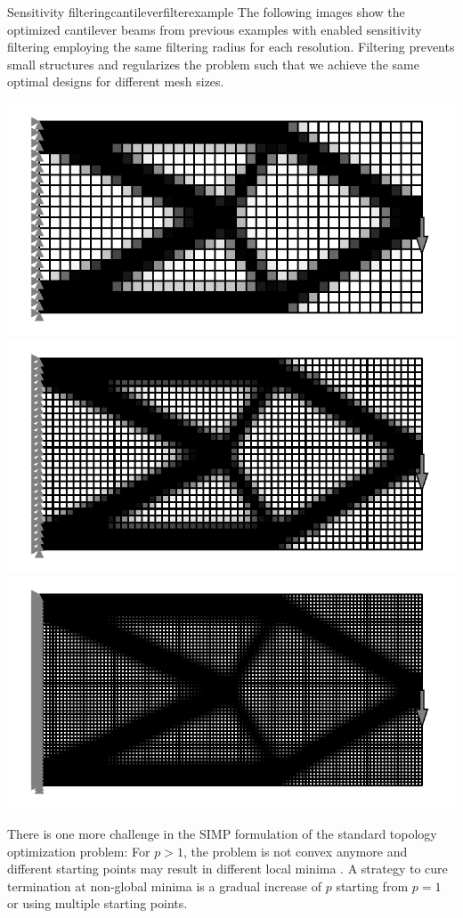 \begin{example}{Sensitivity filtering}{cantileverfilterexample}
    The following images show the optimized cantilever beams from previous examples with enabled sensitivity filtering employing the same filtering radius for each resolution. Filtering prevents small structures and regularizes the problem such that we achieve the same optimal designs for different mesh sizes.
    \begin{center}
        \includegraphics[width=0.7\linewidth]{figures/cantilever_fem_optimized_binary_filtered.pdf}
        \includegraphics[width=0.7\linewidth]{figures/cantilever_fem_optimized_binary_fine_filtered.pdf}
        \includegraphics[width=0.7\linewidth]{figures/cantilever_fem_optimized_binary_extra_fine_filtered.pdf}
    \end{center}
\end{example}

There is one more challenge in the SIMP formulation of the standard topology optimization problem: For $p>1$, the problem is not convex anymore and different starting points may result in different local minima \cite{Christensen2008}. A strategy to cure termination at non-global minima is a gradual increase of $p$ starting from $p=1$ or using multiple starting points.

